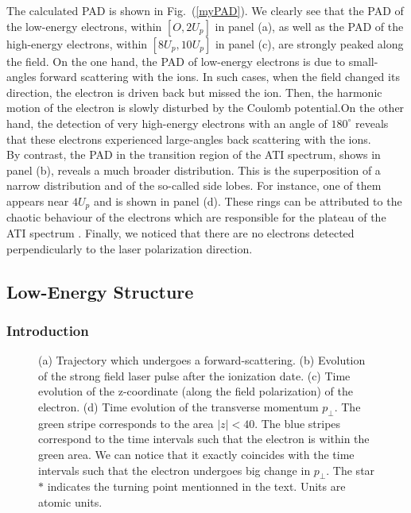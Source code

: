 \documentclass[a4paper]{article}
\begin{document}
\par
The calculated PAD is shown in Fig.~(\ref{myPAD}). We clearly see that the PAD of the low-energy electrons, within $[O, 2U_{p}]$ in panel (a), as well as the PAD of the high-energy electrons, within $[8U_{p}, 10U_{p}]$ in panel (c), are strongly peaked along the field. On the one hand, the PAD of low-energy electrons is due to small-angles forward scattering with the ions. In such cases, when the field changed its direction, the electron is driven back but missed the ion. Then, the harmonic motion of the electron is slowly disturbed by the Coulomb potential.On the other hand, the detection of very high-energy electrons with an angle of $180^{\circ}$ reveals that these electrons experienced large-angles back scattering with the ions. \\
By contrast, the PAD in the transition region of the ATI spectrum, shows in panel (b), reveals a much broader distribution. This is the superposition of a narrow distribution and of the so-called side lobes. For instance, one of them appears near $4U_{p}$ and is shown in panel (d). These rings can be attributed to the chaotic behaviour of the electrons which are responsible for the plateau of the ATI spectrum \cite{Hu_1997}. 
Finally, we noticed that there are no electrons detected perpendicularly to the laser polarization direction.



\subsection{Low-Energy Structure}
\subsubsection{Introduction}

\begin{figure}[htp]
 \resizebox{1\textwidth}{!}{}
 \caption{ (a) Trajectory which undergoes a forward-scattering. (b) Evolution of the strong field laser pulse after the ionization date. (c) Time evolution of the z-coordinate (along the field polarization) of the electron. (d) Time evolution of the transverse momentum $p_{\perp}$. The green stripe corresponds to the area $|z|<40$. The blue stripes correspond to the time intervals such that the electron is within the green area. We can notice that it exactly coincides with the time intervals such that the electron undergoes big change in $p_{\perp}$. The star $*$ indicates the turning point mentionned in the text. Units are atomic units.}
 \label{soft_recollision}
\end{figure}
\end{document}
